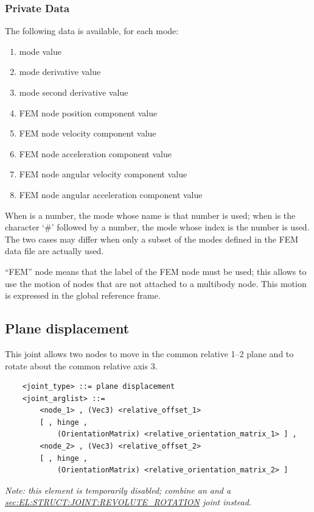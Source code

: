 \subsubsection{Private Data}
The following data is available, for each mode:
\begin{enumerate}
\item {} mode  value
\item {} mode  derivative value
\item {} mode  second derivative value
\item {} FEM node  position  component value
\item {} FEM node  velocity  component value
\item {} FEM node  acceleration  component value
\item {} FEM node  angular velocity  component value
\item {} FEM node  angular acceleration  component value
\end{enumerate}
When  is a number, the mode whose name is that number is used;
when  is the character `\#' followed by a number,
the mode whose index is the number is used.
The two cases may differ when only a subset of the modes defined
in the FEM data file are actually used.

``FEM'' node means that the label of the FEM node must be used;
this allows to use the motion of nodes that are not attached
to a multibody node.
This motion is expressed in the global reference frame.




\subsection{Plane displacement}\label{sec:EL:STRUCT:JOINT:PLANE_DISPLACEMENT}
This joint allows two nodes to move in the common relative 1--2 plane 
and to rotate about the common relative axis 3.
\begin{verbatim}
    <joint_type> ::= plane displacement
    <joint_arglist> ::= 
        <node_1> , (Vec3) <relative_offset_1> 
        [ , hinge , 
            (OrientationMatrix) <relative_orientation_matrix_1> ] ,
        <node_2> , (Vec3) <relative_offset_2>
        [ , hinge , 
            (OrientationMatrix) <relative_orientation_matrix_2> ]
\end{verbatim}
\emph{Note: this element is temporarily disabled;
combine an  and a
\hyperref{\kw{revolute rotation}}{\kw{revolute rotation} (see Section~}{)}{sec:EL:STRUCT:JOINT:REVOLUTE_ROTATION}
joint instead.}

